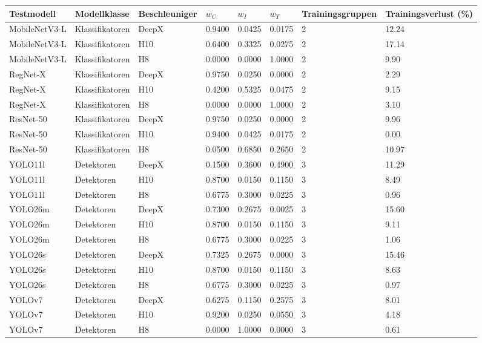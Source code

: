 \begin{tabular}{@{}llllllll@{}}
\toprule
Testmodell & Modellklasse & Beschleuniger & $w_C$ & $w_I$ & $w_T$ & Trainingsgruppen & Trainingsverlust (\%) \\
\midrule
MobileNetV3-L & Klassifikatoren & DeepX & 0.9400 & 0.0425 & 0.0175 & 2 & 12.24 \\
MobileNetV3-L & Klassifikatoren & H10 & 0.6400 & 0.3325 & 0.0275 & 2 & 17.14 \\
MobileNetV3-L & Klassifikatoren & H8 & 0.0000 & 0.0000 & 1.0000 & 2 & 9.90 \\
RegNet-X & Klassifikatoren & DeepX & 0.9750 & 0.0250 & 0.0000 & 2 & 2.29 \\
RegNet-X & Klassifikatoren & H10 & 0.4200 & 0.5325 & 0.0475 & 2 & 9.15 \\
RegNet-X & Klassifikatoren & H8 & 0.0000 & 0.0000 & 1.0000 & 2 & 3.10 \\
ResNet-50 & Klassifikatoren & DeepX & 0.9750 & 0.0250 & 0.0000 & 2 & 9.96 \\
ResNet-50 & Klassifikatoren & H10 & 0.9400 & 0.0425 & 0.0175 & 2 & 0.00 \\
ResNet-50 & Klassifikatoren & H8 & 0.0500 & 0.6850 & 0.2650 & 2 & 10.97 \\
YOLO11l & Detektoren & DeepX & 0.1500 & 0.3600 & 0.4900 & 3 & 11.29 \\
YOLO11l & Detektoren & H10 & 0.8700 & 0.0150 & 0.1150 & 3 & 8.49 \\
YOLO11l & Detektoren & H8 & 0.6775 & 0.3000 & 0.0225 & 3 & 0.96 \\
YOLO26m & Detektoren & DeepX & 0.7300 & 0.2675 & 0.0025 & 3 & 15.60 \\
YOLO26m & Detektoren & H10 & 0.8700 & 0.0150 & 0.1150 & 3 & 9.11 \\
YOLO26m & Detektoren & H8 & 0.6775 & 0.3000 & 0.0225 & 3 & 1.06 \\
YOLO26s & Detektoren & DeepX & 0.7325 & 0.2675 & 0.0000 & 3 & 15.46 \\
YOLO26s & Detektoren & H10 & 0.8700 & 0.0150 & 0.1150 & 3 & 8.63 \\
YOLO26s & Detektoren & H8 & 0.6775 & 0.3000 & 0.0225 & 3 & 0.97 \\
YOLOv7 & Detektoren & DeepX & 0.6275 & 0.1150 & 0.2575 & 3 & 8.01 \\
YOLOv7 & Detektoren & H10 & 0.9200 & 0.0250 & 0.0550 & 3 & 4.18 \\
YOLOv7 & Detektoren & H8 & 0.0000 & 1.0000 & 0.0000 & 3 & 0.61 \\
\bottomrule
\end{tabular}
